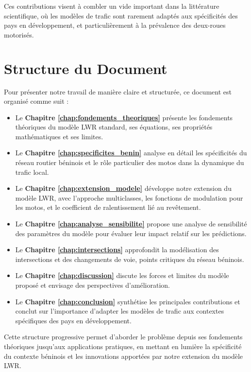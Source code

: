 Ces contributions visent à combler un vide important dans la littérature scientifique, où les modèles de trafic sont rarement adaptés aux spécificités des pays en développement, et particulièrement à la prévalence des deux-roues motorisés.

\section{Structure du Document}
\label{sec:structure}

Pour présenter notre travail de manière claire et structurée, ce document est organisé comme suit :

\begin{itemize}
\item Le \textbf{Chapitre \ref{chap:fondements_theoriques}} présente les fondements théoriques du modèle LWR standard, ses équations, ses propriétés mathématiques et ses limites.

\item Le \textbf{Chapitre \ref{chap:specificites_benin}} analyse en détail les spécificités du réseau routier béninois et le rôle particulier des motos dans la dynamique du trafic local.

\item Le \textbf{Chapitre \ref{chap:extension_modele}} développe notre extension du modèle LWR, avec l'approche multiclasses, les fonctions de modulation pour les motos, et le coefficient de ralentissement lié au revêtement.


\item Le \textbf{Chapitre \ref{chap:analyse_sensibilite}} propose une analyse de sensibilité des paramètres du modèle pour évaluer leur impact relatif sur les prédictions.

\item Le \textbf{Chapitre \ref{chap:intersections}} approfondit la modélisation des intersections et des changements de voie, points critiques du réseau béninois.


\item Le \textbf{Chapitre \ref{chap:discussion}} discute les forces et limites du modèle proposé et envisage des perspectives d'amélioration.

\item Le \textbf{Chapitre \ref{chap:conclusion}} synthétise les principales contributions et conclut sur l'importance d'adapter les modèles de trafic aux contextes spécifiques des pays en développement.
\end{itemize}

Cette structure progressive permet d'aborder le problème depuis ses fondements théoriques jusqu'aux applications pratiques, en mettant en lumière la spécificité du contexte béninois et les innovations apportées par notre extension du modèle LWR.
